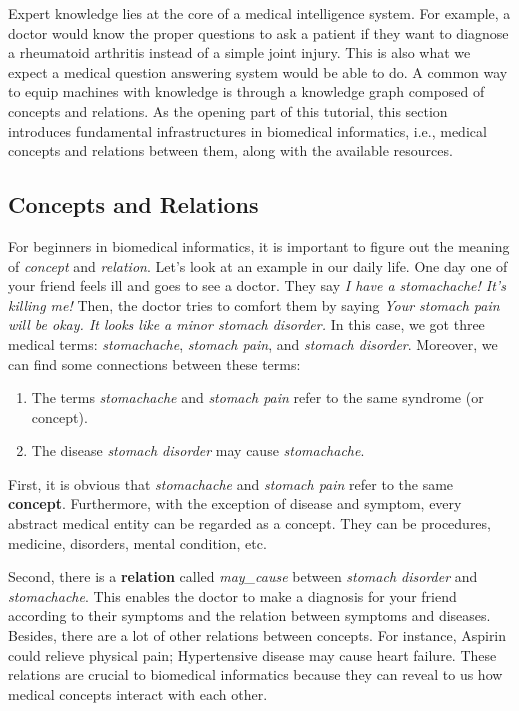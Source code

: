 
Expert knowledge lies at the core of a medical intelligence system. For example, a doctor would know the proper questions to ask a patient if they want to diagnose a rheumatoid arthritis instead of a simple joint injury. This is also what we expect a medical question answering system would be able to do. A common way to equip machines with knowledge is through a knowledge graph composed of concepts and relations. As the opening part of this tutorial, this section introduces fundamental infrastructures in biomedical informatics, i.e., medical concepts and relations between them, along with the available resources.


\subsection{Concepts and Relations}
\label{sec:1.1}
For beginners in biomedical informatics, it is important to figure out the meaning of \emph{concept} and \emph{relation}. 
Let's look at an example in our daily life. One day one of your friend feels ill and goes to see a doctor. They say \emph{I have a stomachache! It's killing me!} Then, the doctor tries to comfort them by saying \emph{Your stomach pain will be okay. It looks like a minor stomach disorder.} In this case, we got three medical terms: \emph{stomachache}, \emph{stomach pain}, and \emph{stomach disorder}. Moreover, we can find some connections between these terms:

\begin{enumerate}
  \item The terms \emph{stomachache} and \emph{stomach pain} refer to the same syndrome (or concept).
  \item The disease \emph{stomach disorder} may cause \emph{stomachache}.
\end{enumerate}

First, it is obvious that \emph{stomachache} and \emph{stomach pain} refer to the same \textbf{concept}. Furthermore, with the exception of disease and symptom, every abstract medical entity can be regarded as a concept. They can be procedures, medicine, disorders, mental condition, etc.

Second, there is a \textbf{relation} called \emph{may\_cause} between \emph{stomach disorder} and \emph{stomachache}. This enables the doctor to make a diagnosis for your friend according to their symptoms and the relation between symptoms and diseases. Besides, there are a lot of other relations between concepts. For instance, Aspirin could relieve physical pain; Hypertensive disease may cause heart failure. These relations are crucial to biomedical informatics because they can reveal to us how medical concepts interact with each other. 


